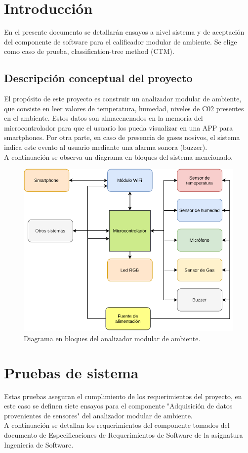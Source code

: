 \documentclass[11pt]{article}
\begin{document}
\section{Introducción}
En el presente documento se detallarán ensayos a nivel sistema y de aceptación del componente de software para el calificador modular de ambiente. Se elige como caso de prueba, classification-tree method (CTM).
\subsection{Descripción conceptual del proyecto}

El propósito de este proyecto es construir un analizador modular de ambiente, que consiste en leer valores de temperatura, humedad, niveles de C02 presentes en el ambiente. Estos datos son almacenenados en la memoria  del microcontrolador para que el usuario los pueda visualizar en una APP para smartphones. Por otra parte, en caso de presencia de gases nosivos, el sistema indica este evento al usuario mediante una alarma sonora (buzzer).
\\A continuación se observa un diagrama en bloques del sistema mencionado.

\vspace{2cm}
\begin{figure}[!ht]
 \centering
\includegraphics[scale=0.8]{Figuras/bloques.pdf} 
\caption{Diagrama en bloques del analizador modular de ambiente.}
\end{figure}

\section{Pruebas de sistema}
Estas pruebas aseguran el cumplimiento de los requerimientos del proyecto, en este caso se definen siete ensayos para el componente "Adquisición de datos provenientes de sensores" del analizador modular de ambiente.
\\ A continuación se detallan los requerimientos del componente tomados del documento de Especificaciones de Requerimientos de Software de la asignatura Ingeniería de Software.\\
\end{document}
